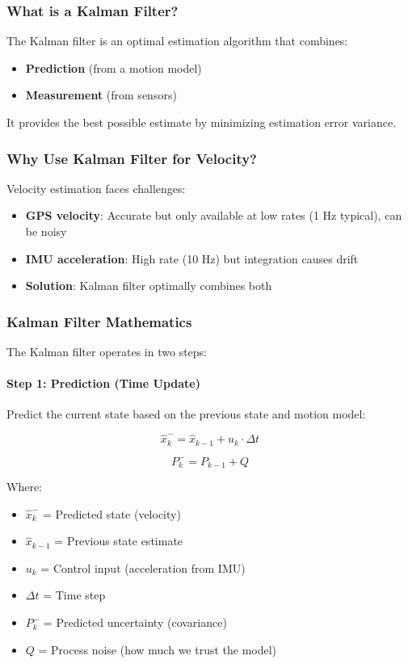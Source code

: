 \documentclass[11pt,a4paper]{article}
\begin{document}
\subsubsection{What is a Kalman Filter?}
The Kalman filter is an optimal estimation algorithm that combines:
\begin{itemize}
    \item \textbf{Prediction} (from a motion model)
    \item \textbf{Measurement} (from sensors)
\end{itemize}

It provides the best possible estimate by minimizing estimation error variance.

\subsubsection{Why Use Kalman Filter for Velocity?}
Velocity estimation faces challenges:
\begin{itemize}
    \item \textbf{GPS velocity}: Accurate but only available at low rates (1 Hz typical), can be noisy
    \item \textbf{IMU acceleration}: High rate (10 Hz) but integration causes drift
    \item \textbf{Solution}: Kalman filter optimally combines both
\end{itemize}

\subsubsection{Kalman Filter Mathematics}
The Kalman filter operates in two steps:

\paragraph{Step 1: Prediction (Time Update)}
Predict the current state based on the previous state and motion model:

\begin{equation}
\hat{x}_k^- = \hat{x}_{k-1} + u_k \cdot \Delta t
\end{equation}

\begin{equation}
P_k^- = P_{k-1} + Q
\end{equation}

Where:
\begin{itemize}
    \item $\hat{x}_k^-$ = Predicted state (velocity)
    \item $\hat{x}_{k-1}$ = Previous state estimate
    \item $u_k$ = Control input (acceleration from IMU)
    \item $\Delta t$ = Time step
    \item $P_k^-$ = Predicted uncertainty (covariance)
    \item $Q$ = Process noise (how much we trust the model)
\end{itemize}
\end{document}
